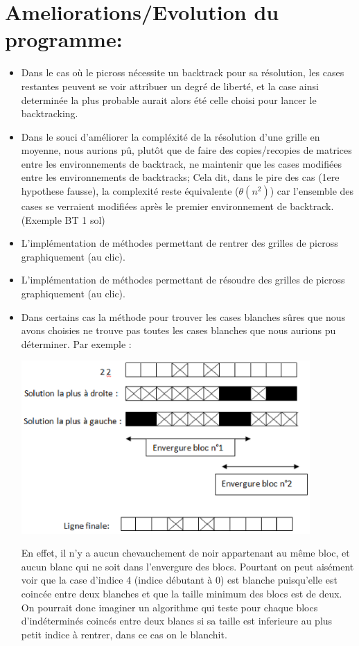 \documentclass{article}
\begin{document}
\section{Ameliorations/Evolution du programme:}
\begin{itemize}
\item Dans le cas où le picross nécessite un backtrack pour sa résolution, les cases restantes peuvent se voir attribuer un degré de liberté, et la case ainsi determinée la plus probable aurait alors été celle choisi pour lancer le backtracking.
\item Dans le souci d'améliorer la compléxité de la résolution d'une grille en moyenne, nous aurions pû, plutôt que de faire des copies/recopies de matrices entre les environnements de backtrack, ne maintenir que les cases modifiées entre les environnements de backtracks;
Cela dit, dans le pire des cas (1ere hypothese fausse), la complexité reste équivalente ($\theta(n^2)$) car l'ensemble des cases se verraient modifiées après le premier environnement de backtrack. (Exemple BT 1 sol)
\item L'implémentation de méthodes permettant de rentrer des grilles de picross graphiquement (au clic).
\item L'implémentation de méthodes permettant de résoudre des grilles de picross graphiquement (au clic).
\item Dans certains cas la méthode pour trouver les cases blanches sûres que nous avons choisies ne trouve pas toutes les cases blanches que nous aurions pu déterminer. Par exemple :
\begin{center}
\includegraphics[width=11cm]{image1}
\end{center}
En effet, il n’y a aucun chevauchement de noir appartenant au même bloc, et aucun blanc qui ne soit dans l’envergure des blocs. Pourtant on peut aisément voir que la case d’indice 4 (indice débutant à 0) est blanche puisqu’elle est coincée entre deux blanches et que la taille minimum des blocs est de deux. On pourrait donc imaginer un algorithme qui teste pour chaque blocs d’indéterminés coincés entre deux blancs si sa taille est inferieure au plus petit indice à rentrer,  dans ce cas on le blanchit.
\end{itemize}
\end{document}
